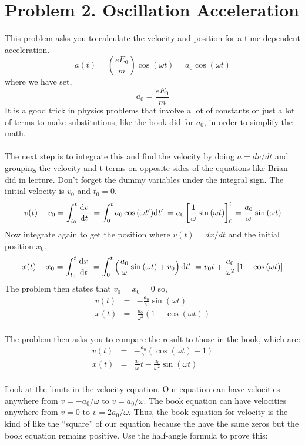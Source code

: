 \documentclass[11pt]{amsart}
\begin{document}
\section{Problem 2. Oscillation Acceleration} 

This problem asks you to calculate the velocity and position for a time-dependent acceleration. 
\\ 
\[
a(t) = \left(\frac{eE_{0}}{m}\right) \cos(\omega{}t) = a_{0} \cos(\omega{}t) 
\]
where we have set,
\[ a_0 = \frac{ e E_0 }{m} \]
It is a good trick in physics problems that involve a lot of constants or just a lot of terms to make substitutions, like the book did for $a_{0}$, in order to simplify the math. \\ \\
The next step is to integrate this and find the velocity by doing $a=dv/dt$ and grouping the velocity and t terms on opposite sides of the equations like Brian did in lecture. Don't forget the dummy variables under the integral sign. The initial velocity is $v_{0}$ and $t_{0}=0$.
\begin{align*}
v(t) - v_0 = \int_{t_0}^t \frac{\mathrm{d}v \:}{\mathrm{d}t \:} = \int_0^t a_0 \cos{(\omega t')} \mathrm{d}t' \: = a_0 \left[ \frac{1}{\omega} \sin{(\omega t)} \right]^t_0 = \frac{a_0}{\omega} \sin{(\omega t)}
\end{align*}
Now integrate again to get the position where $v(t)=dx/dt$ and the initial position $x_{0}$.
\begin{align*}
x(t) - x_0 = \int_{t_0}^t \frac{\mathrm{d}x \:}{\mathrm{d}t \:} = \int_0^t \left( \frac{a_0}{\omega} \sin{(\omega t)} + v_0 \right) \mathrm{d}t' \: = v_0 t + \frac{a_0}{\omega^2} \left[ 1 - \cos{(\omega t)} \right] 
\end{align*}
The problem then states that $v_{0}=x_{0}=0$ so,
\begin{eqnarray*}
v(t) &=& - \frac{a_{0}}{\omega} \sin(\omega{}t) 
\\
x(t) &=& \frac{a_{0}}{\omega^{2}}(1 - \cos(\omega{}t)) 
\end{eqnarray*} \\
The problem then asks you to compare the result to those in the book, which are: \\ 
\begin{eqnarray*} 
v(t) &=& -\frac{a_{0}}{\omega}(\cos(\omega{}t) - 1) \\
x(t) &=& \frac{a_{0}}{\omega}t - \frac{a_{0}}{\omega^{2}} \sin(\omega{}t) 
\end{eqnarray*} \\
Look at the limits in the velocity equation. Our equation can have velocities anywhere from $v=-a_{0}/\omega$ to $v=a_{0}/\omega$. The book equation can have  velocities anywhere from $v=0$ to $v=2a_{0}/\omega$. Thus, the book equation for velocity is the kind of like the ``square'' of our equation because the have the same zeros but the book equation remains positive. Use the half-angle formula to prove this: \\
\end{document}
